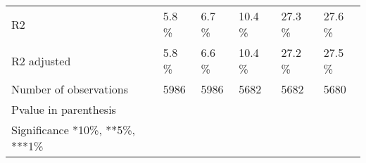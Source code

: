 \begin{tabular}{llllll}
R2                              &          5.8 \% &          6.7 \% &         10.4 \% &         27.3 \% &         27.6 \% \\
R2 adjusted                     &          5.8 \% &          6.6 \% &         10.4 \% &         27.2 \% &         27.5 \% \\
Number of observations          &           5986 &           5986 &           5682 &           5682 &           5680 \\
Pvalue in parenthesis           &                &                &                &                &                \\
Significance *10\%, **5\%, ***1\%  &                &                &                &                &                \\
\bottomrule
\end{tabular}
